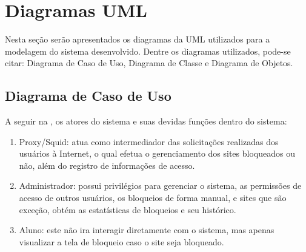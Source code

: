 \documentclass[
  a4paper,%
  12pt,%
  english,%
  brazilian,%
]{article}
\begin{document}
\section*{Diagramas UML}
    Nesta seção serão apresentados os diagramas da UML utilizados para a modelagem do sistema desenvolvido. Dentre os diagramas utilizados, pode-se citar: Diagrama de Caso de Uso, Diagrama de Classe e Diagrama de Objetos.
    
    \subsection*{Diagrama de Caso de Uso}

    A seguir na , os atores do sistema e suas devidas funções dentro do sistema:

\begin{enumerate}
    \item Proxy/Squid: atua como intermediador das solicitações realizadas dos usuários à Internet, o qual efetua o gerenciamento dos sites bloqueados ou não, além do registro de informações de acesso. 
    \item Administrador: possui privilégios  para gerenciar o sistema, as permissões de acesso de outros usuários, os bloqueios de forma manual, e sites que são exceção, obtém as estatísticas de bloqueios e seu histórico.
    \item Aluno: este não ira interagir diretamente com o sistema, mas apenas visualizar a tela de bloqueio caso o site seja bloqueado.
    
\end{enumerate}
\end{document}
